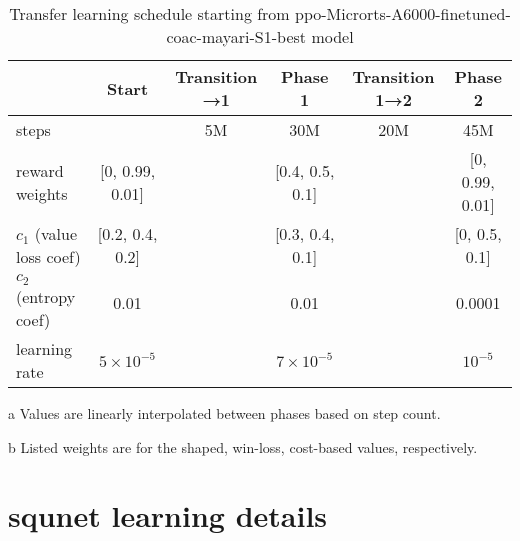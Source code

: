 \documentclass[conference,onecolumn]{IEEEtran}
\newcounter{supptable}
\newenvironment{supptable}
  {\renewcommand{\tablename}{Supplemental Table}\setcounter{table}{\value{supptable}}\addtocounter{supptable}{1}\begin{table}}
  {\end{table}\setcounter{supptable}{\value{table}}}
\begin{document}
\begin{supptable}[H]
    \centering
    \begin{threeparttable}
    \caption{Transfer learning schedule starting from ppo-Microrts-A6000-finetuned-coac-mayari-S1-best model}
    \label{tab:transfer-learning-schedule}
    \begin{tabular}{lccccc}
    \toprule
     & Start & Transition →1\tnote{a} & Phase 1 & Transition 1→2\tnote{a} & Phase 2 \\
     \midrule
    steps & & 5M & 30M & 20M & 45M \\
    reward weights\tnote{b} & [0, 0.99, 0.01] & & [0.4, 0.5, 0.1] & & [0, 0.99, 0.01] \\
    $c_1$ (value loss coef)\tnote{b} & [0.2, 0.4, 0.2] & & [0.3, 0.4, 0.1] & & [0, 0.5, 0.1]\\
    $c_2$ (entropy coef) & 0.01 & & 0.01 & & 0.0001 \\
    learning rate & $5 \times 10^{-5}$ & & $7 \times 10^{-5}$ & & $10^{-5}$ \\
    \bottomrule
    \end{tabular}
    \begin{tablenotes}
       \item[a] Values are linearly interpolated between phases based on step count.
       \item[b] Listed weights are for the shaped, win-loss, cost-based values, respectively.
    \end{tablenotes}
    \end{threeparttable}
\end{supptable}

\section{squnet learning details}
\label{appendix:squnet-learning-details}
\end{document}
